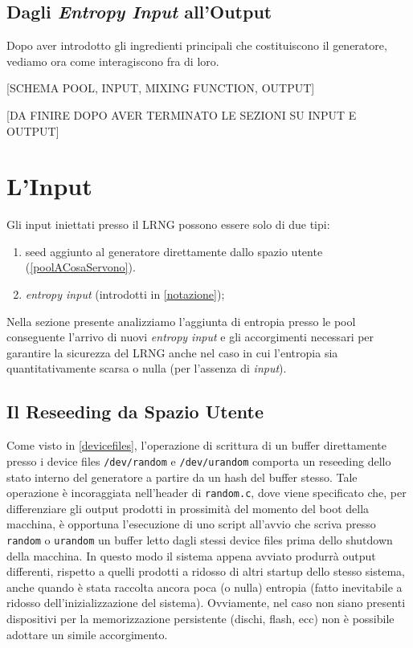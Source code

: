 \documentclass{article}
\begin{document}
\subsection{Dagli \emph{Entropy Input} all'Output}
Dopo aver introdotto gli ingredienti principali che costituiscono il generatore,
vediamo ora come interagiscono fra di loro.

[SCHEMA POOL, INPUT, MIXING FUNCTION, OUTPUT]

[DA FINIRE DOPO AVER TERMINATO LE SEZIONI SU INPUT E OUTPUT] 
  
 \section{L'Input}
 Gli input iniettati presso il LRNG possono essere solo di due tipi:
\begin{enumerate}
  \item seed aggiunto al generatore direttamente dallo spazio utente
  (\ref{poolACosaServono}).
  \item \emph{entropy input} (introdotti in \ref{notazione});
\end{enumerate}
 Nella sezione presente analizziamo l'aggiunta di entropia presso le pool
 conseguente l'arrivo di nuovi \emph{entropy input} e gli accorgimenti necessari
 per garantire la sicurezza del LRNG anche nel caso in cui l'entropia sia
 quantitativamente scarsa o nulla (per l'assenza di \emph{input}).
 
 \subsection{Il Reseeding da Spazio Utente}\label{reseeding}
 Come visto in \ref{devicefiles}, l'operazione di scrittura di un buffer
 direttamente presso i device files \verb+/dev/random+ e \verb+/dev/urandom+
 comporta un reseeding dello stato interno del generatore a partire da un hash
 del buffer stesso. Tale operazione è incoraggiata nell'header di
 \verb+random.c+, dove viene specificato che, per differenziare gli output
 prodotti in prossimità del momento del boot della macchina, è opportuna
 l'esecuzione di uno script all'avvio che scriva presso \verb+random+ o
 \verb+urandom+ un buffer letto dagli stessi device files prima dello shutdown
 della macchina. In questo modo il sistema appena avviato produrrà output
 differenti, rispetto a quelli prodotti a ridosso di altri startup dello stesso
 sistema, anche quando è stata raccolta ancora poca (o nulla) entropia
 (fatto inevitabile a ridosso dell'inizializzazione del sistema).
 Ovviamente, nel caso non siano presenti dispositivi per la memorizzazione
 persistente (dischi, flash, ecc) non è possibile adottare un simile
 accorgimento.
\end{document}
